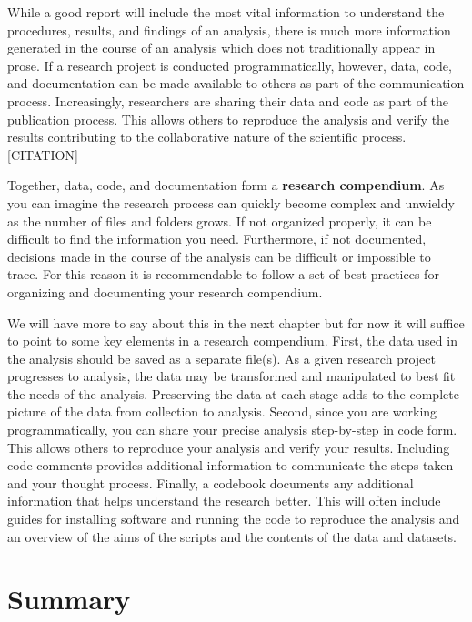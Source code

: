 \documentclass[
  letterpaper,
  DIV=11,
  numbers=noendperiod]{scrreport}
\theoremstyle{definition}
\theoremstyle{remark}
\begin{document}
While a good report will include the most vital information to
understand the procedures, results, and findings of an analysis, there
is much more information generated in the course of an analysis which
does not traditionally appear in prose. If a research project is
conducted programmatically, however, data, code, and documentation can
be made available to others as part of the communication process.
Increasingly, researchers are sharing their data and code as part of the
publication process. This allows others to reproduce the analysis and
verify the results contributing to the collaborative nature of the
scientific process.  {[}CITATION{]}

Together, data, code, and documentation form a \textbf{research
compendium}. As you can imagine the research process can quickly become
complex and unwieldy as the number of files and folders grows. If not
organized properly, it can be difficult to find the information you
need. Furthermore, if not documented, decisions made in the course of
the analysis can be difficult or impossible to trace. For this reason it
is recommendable to follow a set of best practices for organizing and
documenting your research compendium.

We will have more to say about this in the next chapter but for now it
will suffice to point to some key elements in a research compendium.
First, the data used in the analysis should be saved as a separate
file(s). As a given research project progresses to analysis, the data
may be transformed and manipulated to best fit the needs of the
analysis. Preserving the data at each stage adds to the complete picture
of the data from collection to analysis. Second, since you are working
programmatically, you can share your precise analysis step-by-step in
code form. This allows others to reproduce your analysis and verify your
results. Including code comments provides additional information to
communicate the steps taken and your thought process. Finally, a
codebook documents any additional information that helps understand the
research better. This will often include guides for installing software
and running the code to reproduce the analysis and an overview of the
aims of the scripts and the contents of the data and datasets.

\hypertarget{summary-2}{%
\section*{Summary}\label{summary-2}}
\end{document}
